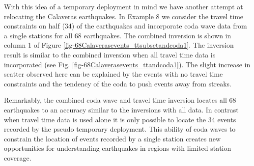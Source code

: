 \documentclass[extra]{gji}
\begin{document}
With this idea of a temporary deployment in mind we have another
attempt at relocating the Calaveras earthquakes. In Example 8
we consider the travel time constraints on half (34) of the
earthquakes and incorporate coda wave data from a single stations
for all 68 earthquakes. The combined inversion is shown in column 1
of Figure \ref{fig-68Calaverasevents_ttsubsetandcoda1}. The
inversion result is similar to the combined inversion when all
travel time data is incorporated (see Fig.
\ref{fig-68Calaverasevents_ttandcoda1}). The slight increase in
scatter observed here can be explained by the events with no travel
time constraints and the tendency of the coda to push events away
from streaks.

Remarkably, the combined coda wave and travel time inversion locates
all 68 earthquakes to an accuracy similar to the inversions with all
data. In contrast when travel time data is used alone it is only
possible to locate the 34 events recorded by the pseudo temporary
deployment. This
ability of  coda waves to constrain the location of events recorded
by a single station creates new opportunities for understanding
earthquakes in regions with limited station coverage.

\end{document}

